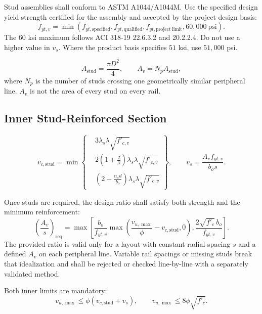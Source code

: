 \documentclass[10pt]{article}
\begin{document}
Stud assemblies shall conform to ASTM A1044/A1044M. Use the specified design
yield strength certified for the assembly and accepted by the project design
basis:
\begin{equation}
f_{yt,v}=
\min(f_{yt,\mathrm{specified}},f_{yt,\mathrm{qualified}},
f_{yt,\mathrm{project\ limit}},60{,}000\ \mathrm{psi}).
\end{equation}
The $60$ ksi maximum follows ACI 318-19 22.6.3.2 and 20.2.2.4. Do not use a
higher value in $v_s$. Where the product basis specifies $51$ ksi, use
$51{,}000$ psi.

\begin{equation}
A_{\mathrm{stud}}=\frac{\pi D^2}{4},\qquad
A_v=N_pA_{\mathrm{stud}},
\end{equation}
where $N_p$ is the number of studs crossing one geometrically similar
peripheral line. $A_v$ is not the area of every stud on every rail.

\subsection{Inner Stud-Reinforced Section}

\begin{equation}
v_{c,\mathrm{stud}}=\min\!\left\{
\begin{aligned}
&3\lambda_s\lambda\sqrt{f'_{c,v}}\\
&2\left(1+\frac{2}{\beta}\right)\lambda_s\lambda\sqrt{f'_{c,v}}\\
&\left(2+\frac{\alpha_s d}{b_o}\right)
  \lambda_s\lambda\sqrt{f'_{c,v}}
\end{aligned}\right\},
\qquad
v_s=\frac{A_vf_{yt,v}}{b_os}.
\end{equation}

Once studs are required, the design ratio shall satisfy both strength and the
minimum reinforcement:
\begin{equation}
\left(\frac{A_v}{s}\right)_{\mathrm{req}}=
\max\!\left[
\frac{b_o}{f_{yt,v}}
\max\!\left(\frac{v_{u,\max}}{\phi}-v_{c,\mathrm{stud}},0\right),
\frac{2\sqrt{f'_c}\,b_o}{f_{yt,v}}
\right].
\end{equation}
The provided ratio is valid only for a layout with constant radial spacing $s$
and a defined $A_v$ on each peripheral line. Variable rail spacings or missing
studs break that idealization and shall be rejected or checked line-by-line with
a separately validated method.

Both inner limits are mandatory:
\begin{equation}
\boxed{v_{u,\max}\leq\phi(v_{c,\mathrm{stud}}+v_s)},\qquad
\boxed{v_{u,\max}\leq8\phi\sqrt{f'_c}}.
\end{equation}
\end{document}
